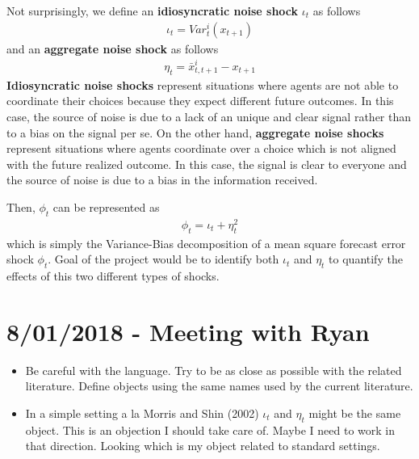\documentclass{article}
\begin{document}
{Not surprisingly, we define an \textbf{idiosyncratic noise shock} $\iota_t$ as follows
\begin{eqnarray}\label{eq:idio_shock}
\iota_t = Var^i_t(x_{t+1})
\end{eqnarray}
and an \textbf{aggregate noise shock} as follows
\begin{eqnarray}\label{eq:aggre_shock}
\eta_t = \bar{x}_{t,t+1}^i - x_{t+1}
\end{eqnarray}
\textbf{Idiosyncratic noise shocks} represent situations where agents are not able to coordinate their choices because they expect different future outcomes. In this case, the source of noise is due to a lack of an unique and clear signal rather than to a bias on the signal per se. On the other hand, \textbf{aggregate noise shocks} represent situations where agents coordinate over a choice which is not aligned with the future realized outcome. In this case, the signal is clear to everyone and the source of noise is due to a bias in the information received.

Then, $\phi_t$ can be represented as
\begin{eqnarray}\label{eq:bias_var_dec}
\phi_t = \iota_t + \eta_t^2
\end{eqnarray}
which is simply the Variance-Bias decomposition of a mean square forecast error shock $\phi_t$. Goal of the project would be to identify both $\iota_t$ and $\eta_t$ to quantify the effects of this two different types of shocks.

\section*{8/01/2018 - Meeting with Ryan}

\begin{itemize}
	\item Be careful with the language. Try to be as close as possible with the related literature. Define objects using the same names used by the current literature.
	
	\item In a simple setting a la Morris and Shin (2002) $\iota_t$ and $\eta_t$ might be the same object. This is an objection I should take care of. Maybe I need to work in that direction. Looking which is my object related to standard settings.
	

\end{itemize}}
\end{document}

